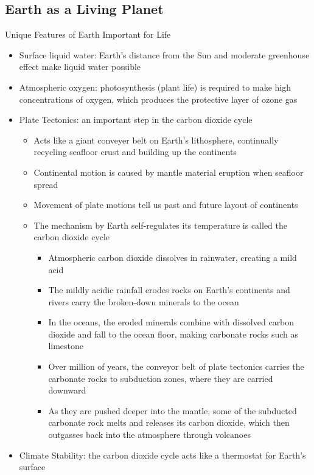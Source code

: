 \documentclass[12pt]{article}
\begin{document}
\subsection{Earth as a Living Planet} 
Unique Features of Earth Important for Life \begin{itemize} 
\item Surface liquid water: Earth's distance from the Sun and moderate greenhouse effect make liquid water possible
\item Atmospheric oxygen: photosynthesis (plant life) is required to make high concentrations of oxygen, which produces the protective layer of ozone gas 
\item Plate Tectonics: an important step in the carbon dioxide cycle \begin{itemize} 
\item Acts like a giant conveyer belt on Earth's lithosphere, continually recycling seafloor crust and building up the continents 
\item Continental motion is caused by mantle material eruption when seafloor spread 
\item Movement of plate motions tell us past and future layout of continents
\item The mechanism by Earth self-regulates its temperature is called the carbon dioxide cycle \begin{itemize} 
\item Atmospheric carbon dioxide dissolves in rainwater, creating a mild acid 
\item The mildly acidic rainfall erodes rocks on Earth's continents and rivers carry the broken-down minerals to the ocean
\item In the oceans, the eroded minerals combine with dissolved carbon dioxide and fall to the ocean floor, making carbonate rocks such as limestone 
\item Over million of years, the conveyor belt of plate tectonics carries the carbonate rocks to subduction zones, where they are carried downward 
\item As they are pushed deeper into the mantle, some of the subducted carbonate rock melts and releases its carbon dioxide, which then outgasses back into the atmosphere through volcanoes \end{itemize} \end{itemize} 
\item Climate Stability: the carbon dioxide cycle acts like a thermostat for Earth's surface \end{itemize} \newpage
\end{document}

